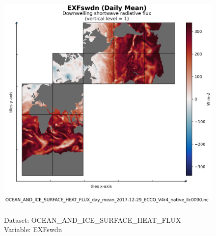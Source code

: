 \begin{figure}[H]
\centering
\includegraphics[scale=0.5]{../images/plots/native_plots/Ocean_and_Sea-Ice_Surface_Heat_Fluxes/EXFswdn.png}
\caption{\\Dataset: OCEAN\_AND\_ICE\_SURFACE\_HEAT\_FLUX\\Variable: EXFswdn}
\label{tab:table-OCEAN_AND_ICE_SURFACE_HEAT_FLUX_EXFswdn-Plot}
\end{figure}
\pagebreak
